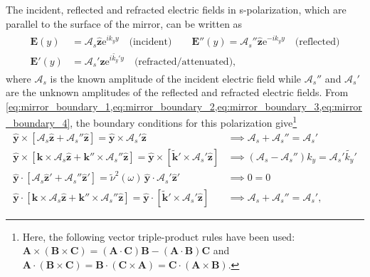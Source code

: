 The incident, reflected and refracted electric fields in s-polarization, which are parallel to the surface of the mirror, can be written as
\begin{align}
\begin{split}
 \mathbold{E}(y) &= \mathcal{A}_s \mathbold{\hat{z}} \mathrm{e}^{i k_y y} \quad \text{(incident)} \quad \quad \mathbold{E''}(y) = \mathcal{A}_s'' \mathbold{\hat{z}} \mathrm{e}^{-i k_y y} \quad \text{(reflected)} \\
 \mathbold{E'}(y) &= \mathcal{A}_s' \mathbold{\hat{z}} \mathrm{e}^{i \tilde{k_y}' y} \quad \text{(refracted/attenuated)} ,
 \end{split}
 \end{align}
where $\mathcal{A}_s$ is the known amplitude of the incident electric field while $\mathcal{A}_s''$ and $\mathcal{A}_s'$ are the unknown amplitudes of the reflected and refracted electric fields. 
From \cref{eq:mirror_boundary_1,eq:mirror_boundary_2,eq:mirror_boundary_3,eq:mirror_boundary_4}, the boundary conditions for this polarization give\footnote{Here, the following vector triple-product rules have been used: $\mathbold{A} \times \left( \mathbold{B} \times \mathbold{C} \right) = \left( \mathbold{A} \cdot \mathbold{C} \right) \mathbold{B} - \left( \mathbold{A} \cdot \mathbold{B} \right) \mathbold{C}$ and $\mathbold{A} \cdot \left( \mathbold{B} \times \mathbold{C} \right) = \mathbold{B} \cdot \left( \mathbold{C} \times \mathbold{A} \right) = \mathbold{C} \cdot \left( \mathbold{A} \times \mathbold{B} \right)$.}  
\begin{subequations}
\begin{align}
 \mathbold{\hat{y}} \times \left[ \mathcal{A}_s \mathbold{\hat{z}} + \mathcal{A}_s'' \mathbold{\hat{z}} \right] = \mathbold{\hat{y}} \times \mathcal{A}_s' \mathbold{\hat{z}} &\implies \mathcal{A}_s + \mathcal{A}_s'' = \mathcal{A}_s' \\
 \mathbold{\hat{y}} \times \left[ \mathbold{k} \times \mathcal{A}_s \mathbold{\hat{z}}  + \mathbold{k''} \times \mathcal{A}_s'' \mathbold{\hat{z}} \right] = \mathbold{\hat{y}} \times \left[ \mathbold{\tilde{k}'} \times \mathcal{A}_s' \mathbold{\hat{z}} \right] &\implies \left( \mathcal{A}_s - \mathcal{A}_s'' \right) k_y = \mathcal{A}_s' \tilde{k_y}' \\ 
 \mathbold{\hat{y}} \cdot \left[ \mathcal{A}_s \mathbold{\hat{z}'} + \mathcal{A}_s'' \mathbold{\hat{z}'} \right] = \tilde{\nu}^2 (\omega) \, \mathbold{\hat{y}} \cdot \mathcal{A}_s' \mathbold{\hat{z}'} &\implies 0 = 0 \\
 \mathbold{\hat{y}} \cdot \left[ \mathbold{k} \times \mathcal{A}_s \mathbold{\hat{z}} + \mathbold{k''} \times \mathcal{A}_s'' \mathbold{\hat{z}} \right] = \mathbold{\hat{y}} \cdot \left[ \mathbold{\tilde{k}'} \times \mathcal{A}_s' \mathbold{\hat{z}} \right] &\implies \mathcal{A}_s + \mathcal{A}_s'' = \mathcal{A}_s' ,
 \end{align}
\end{subequations}
